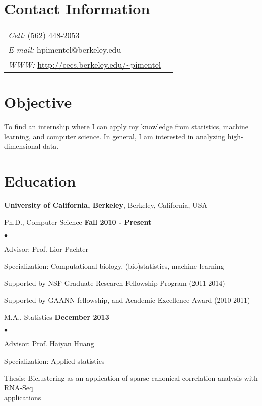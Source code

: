 \documentclass[margin,line]{res}
\newenvironment{list2}{
  \begin{list}{$\bullet$}{%
      \setlength{\itemsep}{0in}
      \setlength{\parsep}{0in} \setlength{\parskip}{0in}
      \setlength{\topsep}{0in} \setlength{\partopsep}{0in} 
      \setlength{\leftmargin}{0.2in}}}{\end{list}}
\begin{document}

\begin{resume}
\section{\sc Contact Information}
\vspace{.05in}
\begin{tabular}{@{}p{4in}p{2in}}
 {\it Cell:}  (562) 448-2053 & \\             
 {\it E-mail:}  hpimentel@berkeley.edu & \\       
 {\it WWW:} \url{http://eecs.berkeley.edu/~pimentel} &
\end{tabular}

\section{\sc Objective} 
To find an internship where I can apply my knowledge from statistics, machine
learning, and computer science. In general, I am interested in analyzing
high-dimensional data.

\section{\sc Education}
{\bf University of California, Berkeley}, Berkeley, California, USA

\vspace{-.3cm}
Ph.D., Computer Science \hfill {\bf
 Fall 2010 - Present}\\
\vspace{-.45cm}
\begin{list2}
\vspace*{1mm}
\item Advisor: Prof. Lior Pachter
\item Specialization: Computational biology, (bio)statistics, machine learning
\item Supported by NSF Graduate Research Fellowship Program (2011-2014)
\item Supported by GAANN fellowship, and Academic Excellence Award (2010-2011)
\end{list2}


M.A., Statistics \hfill {\bf
 December 2013}\\
\vspace{-.45cm}
\begin{list2}
\vspace*{1mm}
\item Advisor: Prof. Haiyan Huang
\item Specialization: Applied statistics
\item Thesis: Biclustering as an application of sparse canonical correlation analysis with RNA-Seq \\applications
\end{list2}




\end{resume}
\end{document}
